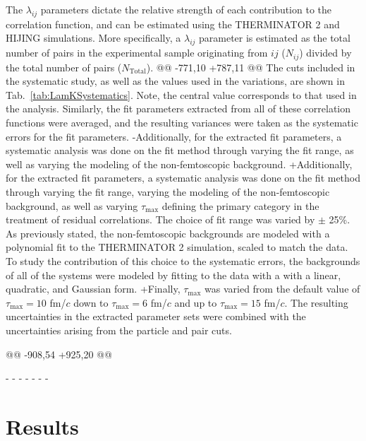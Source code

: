  The $\lambda_{ij}$ parameters dictate the relative strength of each contribution to the correlation function, and can be estimated using the THERMINATOR 2 and HIJING simulations.
 More specifically, a $\lambda_{ij}$ parameter is estimated as the total number of \LamK pairs in the experimental sample originating from $ij$ ($N_{ij}$) divided by the total number of \LamK pairs ($N_{\mathrm{Total}}$).
@@ -771,10 +787,11 @@
 The cuts included in the systematic study, as well as the values used in the variations, are shown in Tab.\ \ref{tab:LamKSystematics}.  
 Note, the central value corresponds to that used in the analysis.
 Similarly, the fit parameters extracted from all of these correlation functions were averaged, and the resulting variances were taken as the systematic errors for the fit parameters.
-Additionally, for the extracted fit parameters, a systematic analysis was done on the fit method through varying the \kstar fit range, as well as varying the modeling of the non-femtoscopic background.
+Additionally, for the extracted fit parameters, a systematic analysis was done on the fit method through varying the \kstar fit range, varying the modeling of the non-femtoscopic background, as well as varying $\tau_{\mathrm{max}}$ defining the primary category in the treatment of residual correlations.
 The choice of \kstar fit range was varied by $\pm$ 25\%. 
 As previously stated, the non-femtoscopic backgrounds are modeled with a polynomial fit to the THERMINATOR 2 simulation, scaled to match the data.
 To study the contribution of this choice to the systematic errors, the backgrounds of all of the systems were modeled by fitting to the data with a with a linear, quadratic, and Gaussian form.
+Finally, $\tau_{\mathrm{max}}$ was varied from the default value of $\tau_{\mathrm{max}} = 10$ fm/$c$ down to $\tau_{\mathrm{max}} = 6$ fm/$c$ and up to $\tau_{\mathrm{max}} = 15$ fm/$c$.
 The resulting uncertainties in the extracted parameter sets were combined with the uncertainties arising from the particle and pair cuts.
 
@@ -908,54 +925,20 @@
 
 
 
-
-
-
-
-
-
-
 \section{Results}
 \label{sec:Results}
 
